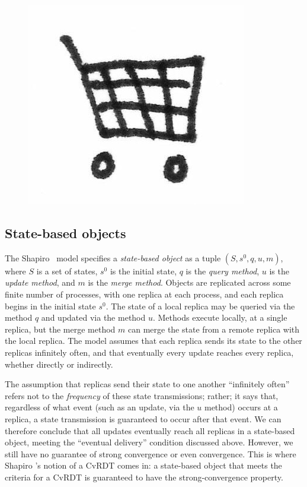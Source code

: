 \ifdefined\DISSERTATION
\begin{figure}
\vspace{-2em}
\begin{center}
  \includegraphics[scale=0.2]{../illustrations/shopping-cart}
\end{center}
\vspace{-1.5em}
\end{figure}
\fi

\subsection{State-based objects}

The Shapiro \etal~model specifies a \emph{state-based object} as a
tuple $(S, s^0, q, u, m)$, where $S$ is a set of states, $s^0$ is the
initial state, $q$ is the \emph{query method}, $u$ is the \emph{update
  method}, and $m$ is the \emph{merge method}.  Objects are replicated
across some finite number of processes, with one replica at each
process, and each replica begins in the initial state $s^0$.  The
state of a local replica may be queried via the method $q$ and updated
via the method $u$.  Methods execute locally, at a single replica, but
the merge method $m$ can merge the state from a remote replica with
the local replica.  The model assumes that each replica sends its
state to the other replicas infinitely often, and that eventually
every update reaches every replica, whether directly or indirectly.

The assumption that replicas send their state to one another
``infinitely often'' refers not to the \emph{frequency} of these state
transmissions; rather; it says that, regardless of what event (such as
an update, via the $u$ method) occurs at a replica, a state
transmission is guaranteed to occur after that event.  We can
therefore conclude that all updates eventually reach all replicas in a
state-based object, meeting the ``eventual delivery'' condition
discussed above.  However, we still have no guarantee of strong
convergence or even convergence.  This is where Shapiro \etal's notion
of a CvRDT comes in: a state-based object that meets the criteria for
a CvRDT is guaranteed to have the strong-convergence property.


